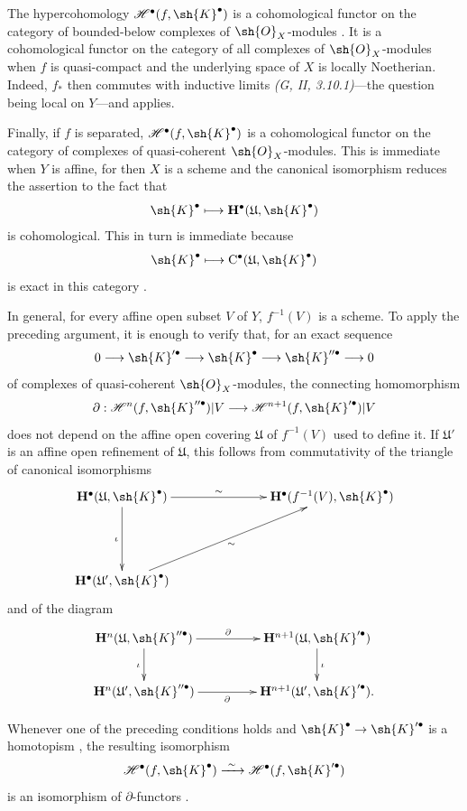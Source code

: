 \begin{env}[6.2.6]
\label{III.6.2.6}
The hypercohomology
$\mathcal{H}^\bullet(f,\sh{K}^\bullet)$ is a cohomological functor
on the category of bounded-below complexes of $\sh{O}_X$-modules
.  It is a cohomological functor on the category
of all complexes of $\sh{O}_X$-modules when $f$ is quasi-compact
and the underlying space of $X$ is locally Noetherian.  Indeed,
$f_*$ then commutes with inductive limits
\emph{(G, II, 3.10.1)}---the question being local on $Y$---and
 applies.

Finally, if $f$ is separated,
$\mathcal{H}^\bullet(f,\sh{K}^\bullet)$ is a cohomological functor
on the category of complexes of quasi-coherent
$\sh{O}_X$-modules.  This is immediate when $Y$ is affine, for
then $X$ is a scheme and the canonical isomorphism
 reduces the assertion to the fact that
\[
  \sh{K}^\bullet\longmapsto
  \mathbf{H}^\bullet(\mathfrak{U},\sh{K}^\bullet)
\]
is cohomological.  This in turn is immediate because
\[
  \sh{K}^\bullet\longmapsto
  \mathrm{C}^\bullet(\mathfrak{U},\sh{K}^\bullet)
\]
is exact in this category .

In general, for every affine open subset $V$ of $Y$,
$f^{-1}(V)$ is a scheme.  To apply the preceding argument, it is
enough to verify that, for an exact sequence
\[
  0\longrightarrow\sh{K}'^\bullet
  \longrightarrow\sh{K}^\bullet
  \longrightarrow\sh{K}''^\bullet
  \longrightarrow0
\]
of complexes of quasi-coherent $\sh{O}_X$-modules, the connecting
homomorphism
\[
  \partial:
  \mathcal{H}^n(f,\sh{K}''^\bullet)|V
  \longrightarrow
  \mathcal{H}^{n+1}(f,\sh{K}'^\bullet)|V
\]
does not depend on the affine open covering $\mathfrak{U}$ of
$f^{-1}(V)$ used to define it.  If $\mathfrak{U}'$ is an affine
open refinement of $\mathfrak{U}$, this follows from commutativity
of the triangle of canonical isomorphisms
\[
  \xymatrix@C=34pt@R=22pt{
    \mathbf{H}^\bullet(\mathfrak{U},\sh{K}^\bullet)
      \ar[rr]^-{\sim}
      \ar[dd]_{\iota}
    &&
    \mathbf{H}^\bullet(f^{-1}(V),\sh{K}^\bullet)
    \\
    \\
    \mathbf{H}^\bullet(\mathfrak{U}',\sh{K}^\bullet)
      \ar[uurr]_-{\sim}
  }
\]
and of the diagram
\[
  \xymatrix@C=46pt@R=25pt{
    \mathbf{H}^n(\mathfrak{U},\sh{K}''^\bullet)
      \ar[r]^-{\partial}
      \ar[d]_{\iota}
    &
    \mathbf{H}^{n+1}(\mathfrak{U},\sh{K}'^\bullet)
      \ar[d]^{\iota}
    \\
    \mathbf{H}^n(\mathfrak{U}',\sh{K}''^\bullet)
      \ar[r]_-{\partial}
    &
    \mathbf{H}^{n+1}(\mathfrak{U}',\sh{K}'^\bullet).
  }
\]

Whenever one of the preceding conditions holds and
$\sh{K}^\bullet\to\sh{K}'^\bullet$ is a homotopism
, the resulting isomorphism
\[
  \mathcal{H}^\bullet(f,\sh{K}^\bullet)
  \xrightarrow{\ \sim\ }
  \mathcal{H}^\bullet(f,\sh{K}'^\bullet)
\]
is an isomorphism of $\partial$-functors
.
\end{env}

